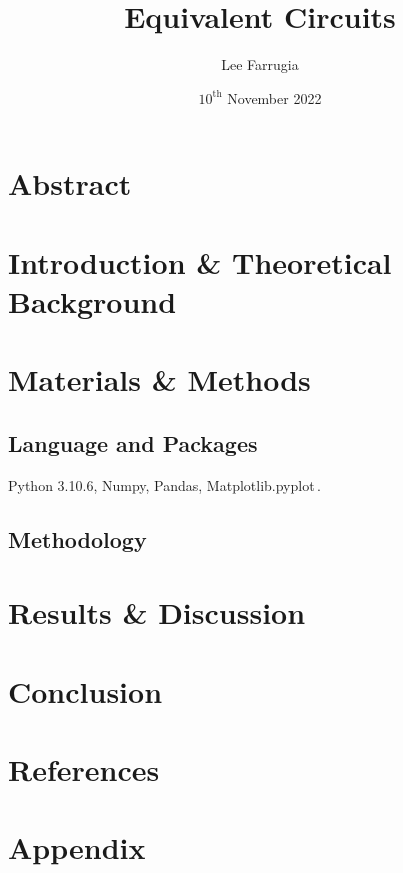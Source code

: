 \documentclass[12pt, a4paper]{article}
\title{Equivalent Circuits}
\date{\(10^\mathrm{{th}}\) November 2022}
\author{Lee Farrugia}
\begin{document}
\maketitle
\thispagestyle{titlepagestyle}
\pagestyle{mystyle}

\section{Abstract}

\section{Introduction \& Theoretical Background}

\section{Materials \& Methods}
  \subsection{Language and Packages}
    Python 3.10.6, Numpy, Pandas, Matplotlib.pyplot\,.

  \subsection{Methodology}

\section{Results \& Discussion}

\section{Conclusion}

\section{References}

\section{Appendix}
\begin{verbatim}

\end{verbatim}
\end{document}
